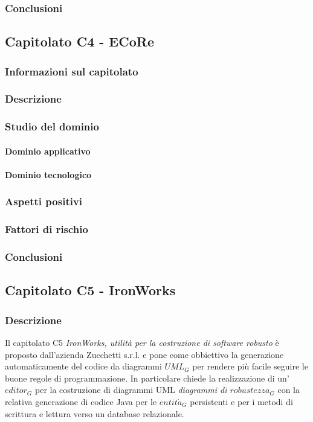 		\subsubsection{Conclusioni}
	
	\subsection{Capitolato C4 - ECoRe}
		\subsubsection{Informazioni sul capitolato}
		\subsubsection{Descrizione}
		\subsubsection{Studio del dominio}
			\paragraph{Dominio applicativo}
			\paragraph{Dominio tecnologico}
		\subsubsection{Aspetti positivi}
		\subsubsection{Fattori di rischio}
		\subsubsection{Conclusioni}
	
	\subsection{Capitolato C5 - IronWorks}
		\subsubsection{Descrizione}
		Il capitolato C5 \emph{IronWorks, utilità per la costruzione di software robusto} è proposto dall'azienda Zucchetti s.r.l. e pone come obbiettivo la generazione automaticamente del codice da diagrammi $UML_G$ per rendere più facile seguire le buone regole di programmazione. In particolare chiede la realizzazione di un'$editor_G$ per la costruzione di diagrammi UML \emph{diagrammi di $robustezza_G$} con la relativa generazione di codice Java per le $entit\acute a_G$ persistenti e per i metodi di scrittura e lettura verso un database relazionale. 
